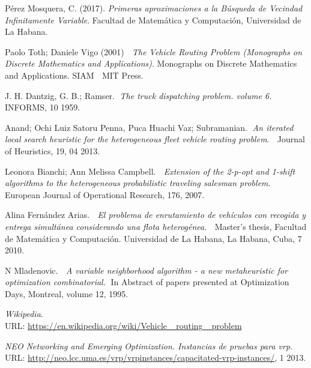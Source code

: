\documentclass[a4paper,10pt,twocolumn]{article}
\begin{document}



\begin{thebibliography}{99}
	 Pérez Mosquera, C. (2017).	\emph{Primeras aproximaciones 
	a la Búsqueda de Vecindad Infinitamente Variable}. Facultad de Matemática y Computación, 
	Universidad de La Habana.
	
	 Paolo Toth; Daniele Vigo (2001) $\;$ \textit{The Vehicle Routing 
	Problem (Monographs on Discrete Mathematics and Applications)}. Monographs on 
	Discrete Mathematics and Applications. SIAM $\;$
	MIT Press.
	
	 J. H. Dantzig, G. B.; Ramser. $\;$\textit{The truck dispatching 
	problem. volume 6.} $\;$ INFORMS, 10 1959.
	
	 Anand; Ochi Luiz Satoru Penna, Puca Huachi Vaz; Subramanian.$\;$ 
	\textit{An iterated local search heuristic for the heterogeneous fleet vehicle 
	routing problem}. $\;$ Journal of Heuristics, 19, 04 2013.

	 Leonora Bianchi; Ann Melissa Campbell. $\;$ \textit{Extension of 
	the 2-p-opt and 1-shift algorithms to the heterogeneous probabilistic traveling 
	salesman problem}.$\;$ European Journal of Operational Research, 176, 2007.

	  Alina Fernández Arias. $\;$ \textit{El problema de enrutamiento de 
	vehículos con recogida y entrega simultánea considerando una flota heterogénea.} 
	$\;$ Master’s thesis, Facultad de Matemática y Computación. Universidad de La Habana, 
	La Habana, Cuba, 7 2010.
	
	 N Mladenovic. $\;$ \textit{A variable neighborhood algorithm - a new 
	metaheuristic for optimization combinatorial.}$\;$ In Abstract of papers presented at 
	Optimization Days, Montreal, volume 12, 1995.

	 \textit{Wikipedia}.\\
	URL: \href{https://en.wikipedia.org/wiki/Vehicle\_ routing\_ problem}
	{https://en.wikipedia.org/wiki/Vehicle\_ routing\_ problem}
	
	 \textit{NEO Networking and Emerging Optimization.	Instancias de pruebas
	para vrp.} \\
	URL: \href{http://neo.lcc.uma.es/vrp/vrpinstances/capacitated-vrp-instances/}
	{http://neo.lcc.uma.es/vrp/vrpinstances/capacitated-vrp-instances/}, 1 2013.
\end{thebibliography}


\label{end}
\end{document}
